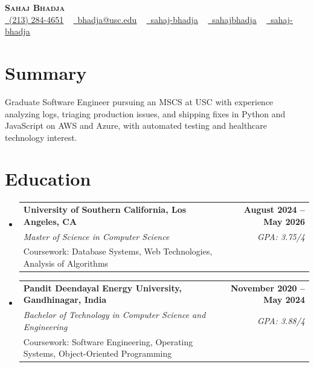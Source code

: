 \documentclass[letterpaper,10pt]{article}
\makeatletter
\newcommand{\resumeEduSubheading}[5]{\vspace{-1pt}\item\begin{tabular*}{1.0\textwidth}[t]{l@{\extracolsep{\fill}}r}\textbf{#1} & \textbf{\small #2} \\\textit{\small #3} & \textit{\small #4} \\\small #5 & \\\end{tabular*}\vspace{-4pt}}
\newcommand{\resumeSubHeadingListStart}{\begin{itemize}[leftmargin=0.0in, label={}]}
\newcommand{\resumeSubHeadingListEnd}{\end{itemize}}
\makeatother
\begin{document}
\begin{center}
{\Huge \scshape \textbf{Sahaj Bhadja}} \\ \vspace{1pt}
\small \href{tel:(213) 284-4651}{\faPhone\ \underline{(213) 284-4651}} ~ \href{mailto: bhadja@usc.edu}{\raisebox{-0.2\height}\faEnvelope\ \underline{bhadja@usc.edu}} ~
\href{https://www.linkedin.com/in/sahaj-bhadja/}{\raisebox{-0.2\height}\faLinkedin\ \underline{sahaj-bhadja}} ~ \href{https://github.com/SAHAJ-BHADJA}{\raisebox{-0.2\height}\faGithub\ \underline{sahajbhadja}} ~
\href{https://sahaj-bhadja.vercel.app/}{\raisebox{-0.2\height}\faGlobe\ \underline{sahaj-bhadja}}
\end{center}
\vspace{-16pt}
\section{Summary}
\begin{itemize}[leftmargin=0.15in, label={}]
\small{\item{Graduate Software Engineer pursuing an MSCS at USC with experience analyzing logs, triaging production issues, and shipping fixes in Python and JavaScript on AWS and Azure, with automated testing and healthcare technology interest.}}
\end{itemize}
\vspace{-6pt}
\section{Education}
\resumeSubHeadingListStart
\resumeEduSubheading{University of Southern California, Los Angeles, CA}{August 2024 -- May 2026}{Master of Science in Computer Science}{GPA: 3.75/4}{Coursework: Database Systems, Web Technologies, Analysis of Algorithms}
\vspace{-9pt}
\resumeEduSubheading{Pandit Deendayal Energy University, Gandhinagar, India}{November 2020 -- May 2024}{Bachelor of Technology in Computer Science and Engineering}{GPA: 3.88/4}{Coursework: Software Engineering, Operating Systems, Object-Oriented Programming}
\resumeSubHeadingListEnd
\vspace{-6pt}
\end{document}
